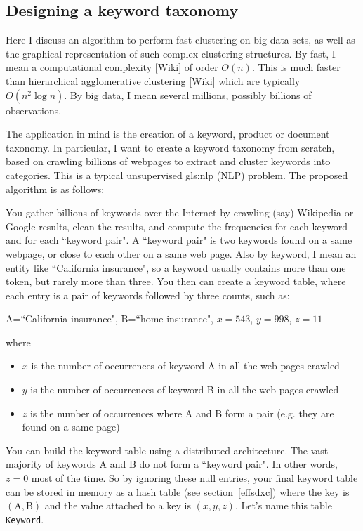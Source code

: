 \documentclass[oneside,10pt]{book}
\begin{document}
\subsection{Designing a keyword taxonomy} 

Here I discuss an algorithm to perform fast clustering on big data sets, as well as the graphical representation of such complex clustering structures. By fast, I mean a \textcolor{index}{computational complexity} [\href{https://en.wikipedia.org/wiki/Computational_complexity}{Wiki}] of order $O(n)$. This is much faster than 
\textcolor{index}{hierarchical agglomerative clustering} [\href{https://en.wikipedia.org/wiki/Hierarchical_clustering}{Wiki}] which are typically $O(n^2 \log n)$. By big data, I mean several millions, possibly billions of observations.

The application in mind is the creation of a keyword, product or document taxonomy. In particular, I want to create a keyword taxonomy from scratch, based 
on crawling billions of webpages to extract and cluster keywords into categories. This is a typical unsupervised \gls{gls:nlp} (NLP) problem.
The proposed algorithm is as follows: \vspace{1ex}

\label{ppioppoo}

\noindent You gather billions of keywords over the Internet by crawling (say) Wikipedia or Google results, clean the results, and compute the frequencies for each keyword and for each ``keyword pair". A ``keyword pair" is two keywords found on a same webpage, or close to each other on a same web page. Also by keyword, I mean an entity like ``California insurance", so a keyword usually contains more than one token, but rarely more than three. You then can create a keyword table,  where each entry is a pair of keywords followed by three counts, such as: %
\begin{center}
A=``California insurance", B=``home insurance", $x=543$, $y=998$, $z=11$
\end{center}
where
\begin{itemize}
	\item $x$ is the number of occurrences of keyword A in all the web pages crawled
	\item $y$ is the number of occurrences of keyword B in all the web pages crawled
	\item $z$ is the number of occurrences where A and B form a pair (e.g. they are found on a same page)
\end{itemize}
You can build the keyword table using a distributed architecture. The vast majority of keywords A and B do not form a 
``keyword pair". In other words, $z=0$ most of the time. So by ignoring these null entries, your final keyword table can be stored in memory 
as a \textcolor{index}{hash table} (see section~\ref{effsdxc}) where the key is $(\text{A}, \text{B})$ and the value
 attached to a key is $(x, y, z)$. Let's name this table \texttt{Keyword}.\vspace{1ex}
\end{document}

